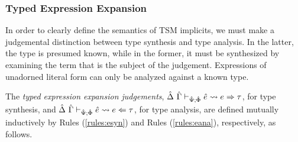 \subsubsection{Typed Expression Expansion}
In order to clearly define the semantics of TSM implicits, we must make a judgemental distinction between type synthesis and type analysis. In the latter, the type is presumed known, while in the former, it must be synthesized by examining the term that is the subject of the judgement. Expressions of unadorned literal form can only be analyzed against a known type.%

The \emph{typed expression expansion judgements}, $\hat{\Delta}~\hat{\Gamma} \vdash_{\hat{\Psi}; \hat\Phi} {\hat e} \leadsto e \Rightarrow \tau$, for type synthesis, and $\hat{\Delta}~\hat{\Gamma} \vdash_{\hat{\Psi}; \hat\Phi} {\hat e} \leadsto e \Leftarrow \tau$, for type analysis, are defined mutually inductively by Rules (\ref{rules:esyn}) and Rules (\ref{rules:eana}), respectively, as follows. 

